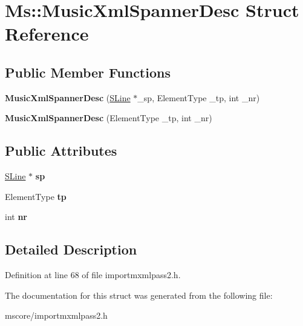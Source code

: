\hypertarget{struct_ms_1_1_music_xml_spanner_desc}{}\section{Ms\+:\+:Music\+Xml\+Spanner\+Desc Struct Reference}
\label{struct_ms_1_1_music_xml_spanner_desc}
\subsection*{Public Member Functions}
\begin{DoxyCompactItemize}
\item 
\mbox{\label{struct_ms_1_1_music_xml_spanner_desc_a3b43b36148d0ff76ed45d19c52cf383b}} 
{\bfseries Music\+Xml\+Spanner\+Desc} (\hyperlink{class_ms_1_1_s_line}{S\+Line} $\ast$\+\_\+sp, Element\+Type \+\_\+tp, int \+\_\+nr)
\item 
\mbox{\label{struct_ms_1_1_music_xml_spanner_desc_aa409cdd1aec5cf56c6b3c8f4bd20d442}} 
{\bfseries Music\+Xml\+Spanner\+Desc} (Element\+Type \+\_\+tp, int \+\_\+nr)
\end{DoxyCompactItemize}
\subsection*{Public Attributes}
\begin{DoxyCompactItemize}
\item 
\mbox{\label{struct_ms_1_1_music_xml_spanner_desc_a2577d6feb2216c345b107502eb18ed7a}} 
\hyperlink{class_ms_1_1_s_line}{S\+Line} $\ast$ {\bfseries sp}
\item 
\mbox{\label{struct_ms_1_1_music_xml_spanner_desc_a60a09b9bce2d5bafb713ccacb6c48e6f}} 
Element\+Type {\bfseries tp}
\item 
\mbox{\label{struct_ms_1_1_music_xml_spanner_desc_a0cfaf4172eaf1f0dda3d548d0a6025c2}} 
int {\bfseries nr}
\end{DoxyCompactItemize}


\subsection{Detailed Description}


Definition at line 68 of file importmxmlpass2.\+h.



The documentation for this struct was generated from the following file\+:\begin{DoxyCompactItemize}
\item 
mscore/importmxmlpass2.\+h\end{DoxyCompactItemize}
